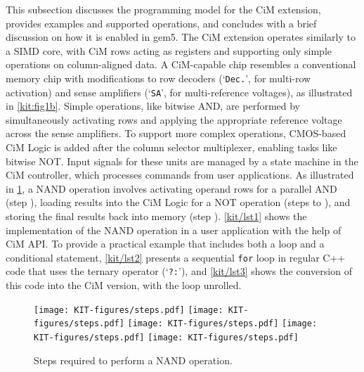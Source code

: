 This subsection discusses the programming model for the CiM extension, provides examples and supported operations, and concludes with a brief discussion on how it is enabled in gem5. The CiM extension operates similarly to a SIMD core, with CiM rows acting as registers and supporting only simple operations on column-aligned data. A CiM-capable chip resembles a conventional memory chip with modifications to row decoders (`\texttt{Dec.}', for multi-row activation) and sense amplifiers (`\texttt{SA}', for multi-reference voltages), as illustrated in \cref{kit:fig1b}. Simple operations, like bitwise AND, are performed by simultaneously activating rows and applying the appropriate reference voltage across the sense amplifiers.
To support more complex operations, CMOS-based CiM Logic is added after the column selector multiplexer, enabling tasks like bitwise NOT. Input signals for these units are managed by a state machine in the CiM controller, which processes commands from user applications. As illustrated in \cref{kit/fig2}, a NAND operation involves activating operand rows for a parallel AND (step ), loading results into the CiM Logic for a NOT operation (steps  to ), and storing the final results back into memory (step ). \cref{kit/lst1} shows the implementation of the NAND operation in a user application with the help of CiM API.
To provide a practical example that includes both a loop and a conditional statement, \cref{kit/lst2} presents a sequential \texttt{for} loop in regular C++ code that uses the ternary operator (`\texttt{?:}'), and \cref{kit/lst3} shows the conversion of this code into the CiM version, with the loop unrolled.

\begin{figure}[h]
	\centering
	\texttt{[image: KIT-figures/steps.pdf]}
	\texttt{[image: KIT-figures/steps.pdf]}
	\texttt{[image: KIT-figures/steps.pdf]}
	\texttt{[image: KIT-figures/steps.pdf]}
	\texttt{[image: KIT-figures/steps.pdf]}
	\caption{Steps required to perform a NAND operation.}
	\label{kit/fig2}
\end{figure}


